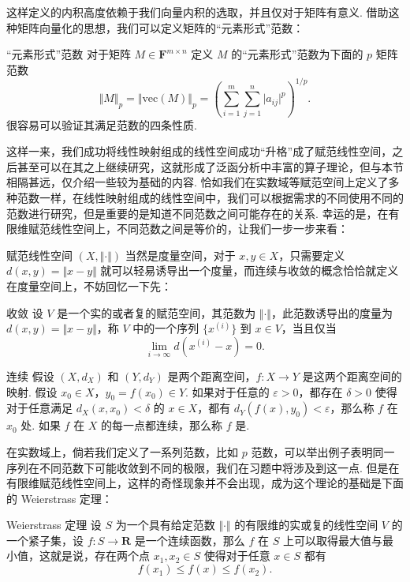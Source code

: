 这样定义的内积高度依赖于我们向量内积的选取，并且仅对于矩阵有意义. 借助这种矩阵向量化的思想，我们可以定义矩阵的\textrm{“元素形式”范数}：

\begin{definition}{“元素形式”范数}{}
    对于矩阵 $M\in \mathbf{F}^{m\times n}$ 定义 $M$ 的\textrm{“元素形式”范数}为下面的 $p$ 矩阵范数 \[\Vert M\Vert_p = \Vert \mathrm{vec}(M) \Vert_p = \left(\sum_{i = 1}^{m}\sum_{j = 1}^{n} \vert a_{ij}\vert^p\right)^{1/p}.\]
    很容易可以验证其满足范数的四条性质.
\end{definition}

这样一来，我们成功将线性映射组成的线性空间成功“升格”成了赋范线性空间，之后甚至可以在其之上继续研究，这就形成了泛函分析中丰富的算子理论，但与本节相隔甚远，仅介绍一些较为基础的内容. 恰如我们在实数域等赋范空间上定义了多种范数一样，在线性映射组成的线性空间中，我们可以根据需求的不同使用不同的范数进行研究，但是重要的是知道不同范数之间可能存在的关系. 幸运的是，在有限维赋范线性空间上，不同范数之间是等价的，让我们一步一步来看：

赋范线性空间 $(X, \Vert \cdot \Vert)$ 当然是度量空间，对于 $x, y\in X$，只需要定义 $d(x, y) = \Vert x-y\Vert$ 就可以轻易诱导出一个度量，而连续与收敛的概念恰恰就定义在度量空间上，不妨回忆一下先：

\begin{definition}{收敛}{}
    设 $V$ 是一个实的或者复的赋范空间，其范数为 $\Vert \cdot \Vert$，此范数诱导出的度量为 $d(x, y) = \Vert x - y\Vert$，称 $V$ 中的一个序列 $\{x^{(i)}\}$ 到 $x\in V$，当且仅当 \[\lim_{i\to\infty}d(x^{(i)} - x) = 0.\]
\end{definition}

\begin{definition}{连续}{}
    假设 $(X,d_X)$ 和 $(Y, d_Y)$ 是两个距离空间，$f: X\to Y$ 是这两个距离空间的映射. 假设 $x_0\in X$，$y_0 = f(x_0)\in Y$. 如果对于任意的 $\varepsilon>0$，都存在 $\delta>0$ 使得对于任意满足 $d_X(x, x_0) < \delta$ 的 $x\in X$，都有 $d_Y(f(x), y_0) < \varepsilon$，那么称 $f$ 在 $x_0$ 处. 如果 $f$ 在 $X$ 的每一点都连续，那么称 $f$ 是.
\end{definition}

在实数域上，倘若我们定义了一系列范数，比如 $p$ 范数，可以举出例子表明同一序列在不同范数下可能收敛到不同的极限，我们在习题中将涉及到这一点. 但是在有限维赋范线性空间上，这样的奇怪现象并不会出现，成为这个理论的基础是下面的 Weierstrass 定理：

\begin{theorem}{Weierstrass 定理}{}
    设 $S$ 为一个具有给定范数 $\Vert \cdot \Vert$ 的有限维的实或复的线性空间 $V$ 的一个紧子集，设 $f\colon S\to\mathbf{R}$ 是一个连续函数，那么 $f$ 在 $S$ 上可以取得最大值与最小值，这就是说，存在两个点 $x_1, x_2\in S$ 使得对于任意 $x\in S$ 都有 \[f(x_1)\leqslant f(x)\leqslant f(x_2).\]
\end{theorem}

